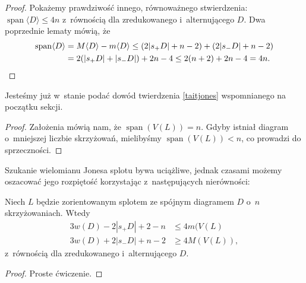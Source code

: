 \begin{proof}
    Pokażemy prawdziwość innego, równoważnego stwierdzenia: $\operatorname{span} \langle D\rangle\le 4n$
    z~równością dla zredukowanego i~alternującego $D$.
    Dwa poprzednie lematy mówią, że
    \begin{align*}
        \operatorname{span}\langle D\rangle
        & = M\langle D\rangle - m\langle D\rangle \le (2|s_+D|+n-2)+(2|s_-D|+n-2) \\
        & = 2(|s_+D|+|s_- D|)+2n-4 \le 2(n+2)+2n-4 = 4n. \qedhere
    \end{align*}
\end{proof}

Jesteśmy już w~stanie podać dowód twierdzenia \ref{taitjones} wspomnianego na początku sekcji.

\begin{proof}
    Założenia mówią nam, że $\operatorname{span} (V(L)) = n$.
    Gdyby istniał diagram o~mniejszej liczbie skrzyżowań,
    mielibyśmy $\operatorname{span} (V(L)) < n$, co prowadzi do sprzeczności.
\end{proof}

Szukanie wielomianu Jonesa splotu bywa uciążliwe,
jednak czasami możemy oszacować jego rozpiętość korzystając z~następujących nierówności:

\begin{corollary}
    Niech $L$ będzie zorientowanym splotem ze spójnym diagramem $D$ o~$n$ skrzyżowaniach.
    Wtedy
    \begin{align*}
        3w(D)-2|s_+D|+2-n & \le 4 m(V(L) \\
        3w(D)+2|s_-D|+n-2 & \ge 4 M(V(L)),
    \end{align*}
    z~równością dla zredukowanego i~alternującego $D$.
\end{corollary}

\begin{proof}
    Proste ćwiczenie.
\end{proof}


